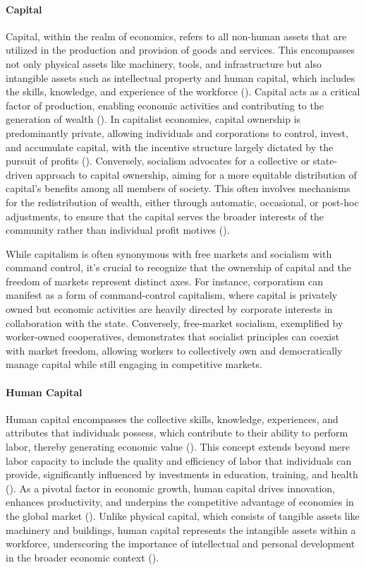 \documentclass{article}
\begin{document}
\paragraph{Capital}
Capital, within the realm of economics, refers to all non-human assets that are utilized in the production and provision of goods and services. This encompasses not only physical assets like machinery, tools, and infrastructure but also intangible assets such as intellectual property and human capital, which includes the skills, knowledge, and experience of the workforce (\cite{smith}). Capital acts as a critical factor of production, enabling economic activities and contributing to the generation of wealth (\cite{marx}). In capitalist economies, capital ownership is predominantly private, allowing individuals and corporations to control, invest, and accumulate capital, with the incentive structure largely dictated by the pursuit of profits (\cite{sweezy}). Conversely, socialism advocates for a collective or state-driven approach to capital ownership, aiming for a more equitable distribution of capital's benefits among all members of society. This often involves mechanisms for the redistribution of wealth, either through automatic, occasional, or post-hoc adjustments, to ensure that the capital serves the broader interests of the community rather than individual profit motives (\cite{socialismToday}).\par

While capitalism is often synonymous with free markets and socialism with command control, it's crucial to recognize that the ownership of capital and the freedom of markets represent distinct axes. For instance, corporatism can manifest as a form of command-control capitalism, where capital is privately owned but economic activities are heavily directed by corporate interests in collaboration with the state. Conversely, free-market socialism, exemplified by worker-owned cooperatives, demonstrates that socialist principles can coexist with market freedom, allowing workers to collectively own and democratically manage capital while still engaging in competitive markets.

\paragraph{Human Capital}
Human capital encompasses the collective skills, knowledge, experiences, and attributes that individuals possess, which contribute to their ability to perform labor, thereby generating economic value (\cite{becker}). This concept extends beyond mere labor capacity to include the quality and efficiency of labor that individuals can provide, significantly influenced by investments in education, training, and health (\cite{solow}). As a pivotal factor in economic growth, human capital drives innovation, enhances productivity, and underpins the competitive advantage of economies in the global market (\cite{smith}). Unlike physical capital, which consists of tangible assets like machinery and buildings, human capital represents the intangible assets within a workforce, underscoring the importance of intellectual and personal development in the broader economic context (\cite{modernResearch}).
\end{document}
